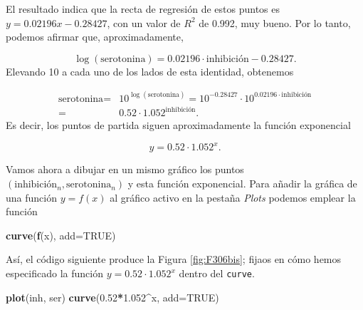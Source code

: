 \documentclass[
]{book}
\newenvironment{Shaded}{\begin{snugshade}}{\end{snugshade}}
\newcommand{\DataTypeTok}[1]{\textcolor[rgb]{0.13,0.29,0.53}{#1}}
\newcommand{\FloatTok}[1]{\textcolor[rgb]{0.00,0.00,0.81}{#1}}
\newcommand{\KeywordTok}[1]{\textcolor[rgb]{0.13,0.29,0.53}{\textbf{#1}}}
\newcommand{\NormalTok}[1]{#1}
\newcommand{\OperatorTok}[1]{\textcolor[rgb]{0.81,0.36,0.00}{\textbf{#1}}}
\newcommand{\OtherTok}[1]{\textcolor[rgb]{0.56,0.35,0.01}{#1}}
\theoremstyle{definition}
\theoremstyle{definition}
\theoremstyle{definition}
\theoremstyle{remark}
\begin{document}
El resultado indica que la recta de regresión de estos puntos es
\(y= 0.02196x-0.28427\), con un valor de \(R^2\) de 0.992, muy bueno.
Por lo tanto, podemos afirmar que, aproximadamente,

\[
\log(\textrm{serotonina})= 0.02196\cdot \mbox{inhibición}-0.28427.
\]
Elevando 10 a cada uno de los lados de esta identidad, obtenemos

\begin{align*}
\textrm{serotonina} = & 10^{\log(\textrm{serotonina})}= 10^{-0.28427}\cdot 10^{0.02196\cdot \textrm{inhibición}} \\ = &  0.52\cdot 1.052^{\textrm{inhibición}}.
\end{align*}
Es decir, los puntos de partida siguen aproximadamente la función exponencial

\[
y=0.52\cdot 1.052^{x}.
\]

Vamos ahora a dibujar en un mismo gráfico
los puntos \((\textrm{inhibición}_n,\textrm{serotonina}_n)\) y esta función exponencial. Para añadir la gráfica de una función \(y=f(x)\) al gráfico activo en la pestaña \emph{Plots} podemos emplear la función

\begin{Shaded}
\begin{Highlighting}[]
\KeywordTok{curve}\NormalTok{(}\KeywordTok{f}\NormalTok{(x), }\DataTypeTok{add=}\OtherTok{TRUE}\NormalTok{)}
\end{Highlighting}
\end{Shaded}

Así, el código siguiente produce la Figura \ref{fig:F306bis}; fijaos en cómo hemos especificado la función \(y=0.52\cdot 1.052^{x}\) dentro del \texttt{curve}.

\begin{Shaded}
\begin{Highlighting}[]
\KeywordTok{plot}\NormalTok{(inh, ser)}
\KeywordTok{curve}\NormalTok{(}\FloatTok{0.52}\OperatorTok{*}\FloatTok{1.052}\OperatorTok{\^{}}\NormalTok{x, }\DataTypeTok{add=}\OtherTok{TRUE}\NormalTok{)}
\end{Highlighting}
\end{Shaded}
\end{document}
